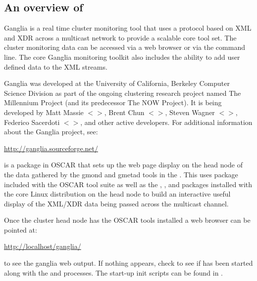 %
%
%

\subsection{An overview of }
\label{app:ganglia-overview}

Ganglia is a real time cluster monitoring tool that uses a protocol
based on XML and XDR across a multicast network to provide a scalable
core tool set.  The cluster monitoring data can be accessed via a web
browser or via the command line. The core Ganglia monitoring toolkit
also includes the ability to add user defined data to the XML streams.

Ganglia was developed at the University of California, Berkeley
Computer Science Division as part of the ongoing clustering research
project named The Millennium Project (and its predecessor The NOW
Project).  It is being developed by Matt Massie
$<$$>$, Brent Chun
$<$$>$, Steven Wagner $<$$>$,
Federico Sacerdoti $<$$>$, and other active developers.
For additional information about the Ganglia project, see:

\vspace{10pt}
\centerline{\url{http://ganglia.sourceforge.net/}}
\vspace{10pt}

 is a package in OSCAR that sets up
the web page display on the head node of the data gathered by the
gmond and gmetad tools in the .
This uses  package included with the OSCAR tool suite
as well as the , , and 
packages installed with the core Linux distribution on the head node
to build an interactive useful display of the XML/XDR data being
passed across the multicast channel.

Once the cluster head node has the OSCAR tools installed a web browser
can be pointed at:

\vspace{10pt}
\centerline{\url{http://localhost/ganglia/}}
\vspace{10pt}

\noindent to see the ganglia web output. If nothing appears, check to
see if  has been started along with the  and
 processes. The start-up init scripts can be found
in .


